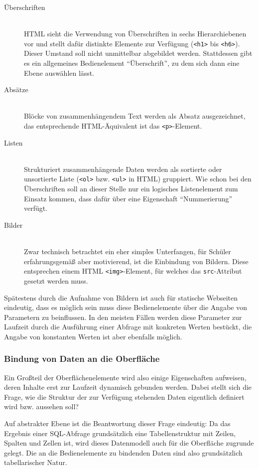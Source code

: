 \begin{description}
\item[Überschriften] \hfill \\
  HTML sieht die Verwendung von Überschriften in sechs Hierarchiebenen vor und stellt dafür distinkte Elemente zur Verfügung (\texttt{<h1>} bis \texttt{<h6>}). Dieser Umstand soll nicht unmittelbar abgebildet werden. Stattdessen gibt es ein allgemeines Bedienelement ``Überschrift'', zu dem sich dann eine Ebene auswählen lässt.
\item[Absätze] \hfill \\
  Blöcke von zusammenhängendem Text werden als Absatz ausgezeichnet, das entsprechende HTML-Äquivalent ist das \texttt{<p>}-Element.
\item[Listen] \hfill \\
  Strukturiert zusammenhängende Daten werden als sortierte oder unsortierte Liste (\texttt{<ol>} bzw. \texttt{<ul>} in HTML) gruppiert. Wie schon bei den Überschriften soll an dieser Stelle nur ein logisches Listenelement zum Einsatz kommen, dass dafür über eine Eigenschaft ``Nummerierung'' verfügt.      
\item[Bilder] \hfill \\
  Zwar technisch betrachtet ein eher simples Unterfangen, für Schüler erfahrungsgemäß aber motivierend, ist die Einbindung von Bildern. Diese entsprechen einem HTML \texttt{<img>}-Element, für welches das \texttt{src}-Attribut gesetzt werden muss.
\end{description}

Spätestens durch die Aufnahme von Bildern ist auch für statische Webseiten eindeutig, dass es möglich sein muss diese Bedienelemente über die Angabe von Parametern zu beinflussen. In den meisten Fällen werden diese Parameter zur Laufzeit durch die Ausführung einer Abfrage mit konkreten Werten bestückt, die Angabe von konstanten Werten ist aber ebenfalls möglich.

\subsubsection{Bindung von Daten an die Oberfläche}
\label{sec:design-ui-bind-output}

Ein Großteil der Oberflächenelemente wird also einige Eigenschaften aufweisen, deren Inhalte erst zur Laufzeit dynamisch gebunden werden. Dabei stellt sich die Frage, wie die Struktur der zur Verfügung stehenden Daten eigentlich definiert wird bzw. aussehen soll?

Auf abstrakter Ebene ist die Beantwortung dieser Frage eindeutig: Da das Ergebnis einer SQL-Abfrage grundsätzlich eine Tabellenstruktur mit Zeilen, Spalten und Zellen ist, wird dieses Datenmodell auch für die Oberfläche zugrunde gelegt. Die an die Bedienelemente zu bindenden Daten sind also grundsätzlich tabellarischer Natur.

